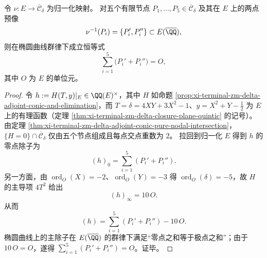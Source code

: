 \begin{theorem}[节点预像十点在椭圆曲线群上的严格求和恒等式]\label{thm:xi-terminal-zm-delta-node-preimage-sum-zero}
令 \(\nu:E\to\overline{\mathcal C}_\delta\) 为归一化映射。
对五个有限节点 \(P_1,\dots,P_5\in\overline{\mathcal C}_\delta\) 及其在 \(E\) 上的两点预像
\[
\nu^{-1}(P_i)=\{P_i',P_i''\}\subset E(\overline{\QQ}),
\]
则在椭圆曲线群律下成立恒等式
\[
\sum_{i=1}^{5}\bigl(P_i'+P_i''\bigr)=O,
\]
其中 \(O\) 为 \(E\) 的单位元。
\end{theorem}
\begin{proof}
令 \(h:=H(T,y)|_{E}\in\QQ(E)^\times\)，其中 \(H\) 如命题 \ref{prop:xi-terminal-zm-delta-adjoint-conic-and-elimination}，而 \(T=\delta=4XY+3X^2-1\)、\(y=X^2+Y-\tfrac12\) 为 \(E\) 上的有理函数（定理 \ref{thm:xi-terminal-zm-delta-closure-plane-quintic} 的记号）。
由定理 \ref{thm:xi-terminal-zm-delta-adjoint-conic-pure-nodal-intersection}，\(\{H=0\}\cap \overline{\mathcal C}_\delta\) 仅由五个节点组成且每点交点重数为 \(2\)。
拉回到归一化 \(E\) 得到 \(h\) 的零点除子为
\[
(h)_0=\sum_{i=1}^{5}(P_i'+P_i'').
\]
另一方面，由 \(\operatorname{ord}_O(X)=-2\)、\(\operatorname{ord}_O(Y)=-3\) 得 \(\operatorname{ord}_O(\delta)=-5\)，故 \(H\) 的主导项 \(4T^2\) 给出
\[
(h)_\infty=10\,O.
\]
从而
\[
(h)=\sum_{i=1}^{5}(P_i'+P_i'')-10\,O.
\]
椭圆曲线上的主除子在 \(E(\overline{\QQ})\) 的群律下满足“零点之和等于极点之和”；由于 \(10\,O=O\)，遂得 \(\sum_{i=1}^5(P_i'+P_i'')=O\)。证毕。
\end{proof}

